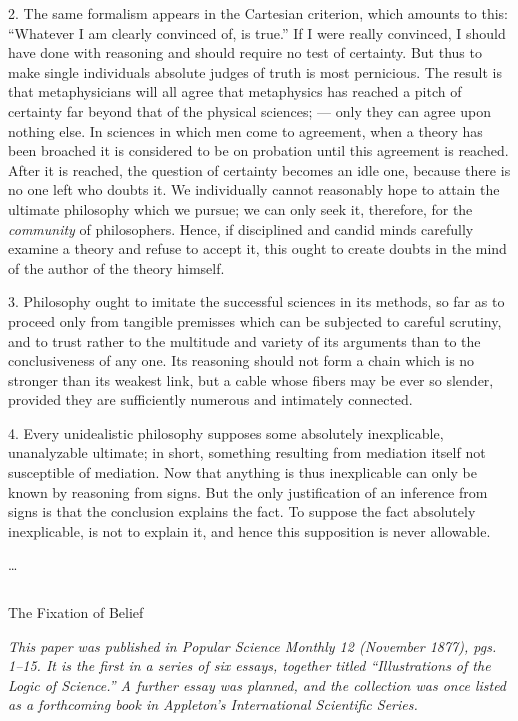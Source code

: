 \documentclass[]{article}
\newcommand{\hbreak}{\par\noindent\begin{tabular*}{\linewidth}{c}\hline\hline\end{tabular*}\par}
\newcommand{\itemtitle}[1]{\pagebreak[2]\hbreak\begin{center}{\Large\sc #1}\end{center}}
\newcommand{\itemcomment}[1]{\noindent\emph{#1}}
\begin{document}
2. The same formalism appears in the Cartesian criterion, which amounts to this: ``Whatever I am clearly convinced of, is true.'' If I were really convinced, I should have done with reasoning and should require no test of certainty. But thus to make single individuals absolute judges of truth is most pernicious. The result is that metaphysicians will all agree that metaphysics has reached a pitch of certainty far beyond that of the physical sciences; --- only they can agree upon nothing else. In sciences in which men come to agreement, when a theory has been broached it is considered to be on probation until this agreement is reached. After it is reached, the question of certainty becomes an idle one, because there is no one left who doubts it. We individually cannot reasonably hope to attain the ultimate philosophy which we pursue; we can only seek it, therefore, for the \emph{community} of philosophers. Hence, if disciplined and candid minds carefully examine a theory and refuse to accept it, this ought to create doubts in the mind of the author of the theory himself.

3. Philosophy ought to imitate the successful sciences in its methods, so far as to proceed only from tangible premisses which can be subjected to careful scrutiny, and to trust rather to the multitude and variety of its arguments than to the conclusiveness of any one. Its reasoning should not form a chain which is no stronger than its weakest link, but a cable whose fibers may be ever so slender, provided they are sufficiently numerous and intimately connected.

4. Every unidealistic philosophy supposes some absolutely inexplicable, unanalyzable ultimate; in short, something resulting from mediation itself not susceptible of mediation. Now that anything is thus inexplicable can only be known by reasoning from signs. But the only justification of an inference from signs is that the conclusion explains the fact. To suppose the fact absolutely inexplicable, is not to explain it, and hence this supposition is never allowable.

\ldots



\itemtitle{The Fixation of Belief}

\itemcomment{This paper was published in \emph{Popular Science Monthly} 12 (November 1877), pgs. 1--15. It is the first in a series of six essays, together titled ``Illustrations of the Logic of Science.'' A further essay was planned, and the collection was once listed as a forthcoming book in Appleton's International Scientific Series.}
\end{document}
